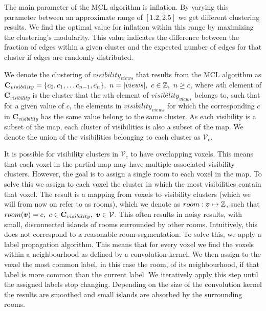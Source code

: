 The main parameter of the MCL algorithm is inflation. By varying this parameter between an approximate range of \([1.2, 2.5]\) we get different clustering results. We find the optimal value for inflation within this range by maximizing the clustering's modularity. This value indicates the difference between the fraction of edges within a given cluster and the expected number of edges for that cluster if edges are randomly distributed. 


We denote the clustering of \(visibility_{views}\) that results from the MCL algorithm as \(\mathbf{C}_{visibility} = \{c_0, c_1, \dots c_{n-1}, c_{n}\},\ n=|views|,\ c \in \mathbb{Z},\ n \geq c\), where \(n\)th element of \(\mathbf{C}_{visibility}\) is the cluster that the \(n\)th element of \(visibility_{views}\) belongs to, such that for a given value of \(c\), the elements in \(visibility_{views}\) for which the corresponding \(c\) in \(\mathbf{C}_{visibility}\) has the same value belong to the same cluster. As each visibility is a subset of the map, each cluster of visibilities is also a subset of the map. We denote the union of the visibilities belonging to each cluster as \(\mathcal{V}_{c}\). 

It is possible for visibility clusters in \(\mathcal{V}_{c}\) to have overlapping voxels. This means that each voxel in the partial map may have multiple associated visibility clusters. However, the goal is to assign a single room to each voxel in the map. To solve this we assign to each voxel the cluster in which the most visibilities contain that voxel. The result is a mapping from voxels to visibility clusters (which we will from now on refer to as rooms), which we denote as \(room: \boldsymbol{v} \mapsto \mathbb{Z}\), such that \(room(\boldsymbol{v}) = c,\ c \in \mathbf{C}_{visibility},\ \boldsymbol{v} \in \mathcal{V}\). This often results in noisy results, with small, disconnected islands of rooms surrounded by other rooms. Intuitively, this does not correspond to a reasonable room segmentation. To solve this, we apply a label propagation algorithm. This means that for every voxel we find the voxels within a neighbourhood as defined by a convolution kernel. We then assign to the voxel the most common label, in this case the room, of its neighbourhood, if that label is more common than the current label. We iteratively apply this step until the assigned labels stop changing. Depending on the size of the convolution kernel the results are smoothed and small islands are absorbed by the surrounding rooms.


